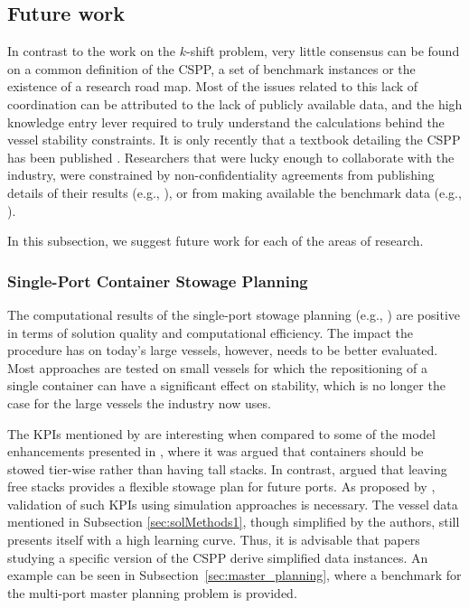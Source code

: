 \documentclass[preprint,12pt,authoryear]{elsarticle}
\begin{document}
\subsection{Future work}
In contrast to the work on the $k$-shift problem, very little consensus can be found on a common definition of the CSPP, a set of benchmark instances or the existence of a research road map. Most of the issues related to this lack of coordination can be attributed to the lack of publicly available data, and the high knowledge entry lever required to truly understand the calculations behind the vessel stability constraints. It is only recently that a textbook detailing the CSPP has been published \citep{Jensen2018ContainerPlanning}. Researchers that were lucky enough to collaborate with the industry, were constrained by non-confidentiality agreements from publishing details of their results (e.g., \cite{Wilson2001ContainerStudy}), or from making available the benchmark data (e.g., \cite{Pacino2011FastVessels}).

In this subsection, we suggest future work for each of the areas of research.

\subsubsection{Single-Port Container Stowage Planning}
The computational results of the single-port stowage planning (e.g., \cite{Cho1981DevelopmentPlanning, Ambrosino2010AnProblem}) are positive in terms of solution quality and computational efficiency. The impact the procedure has on today's large vessels, however, needs to be better evaluated. Most approaches are tested on small vessels for which the repositioning of a single container can have a significant effect on stability, which is no longer the case for the large vessels the industry now uses. 

The KPIs mentioned by \cite{Larsen2021AProblem} are interesting when compared to some of the model enhancements presented in \cite{Zhu2020IntegerProblem}, where it was argued that containers should be stowed tier-wise rather than having tall stacks. In contrast, \cite{Pacino2010ABays, Delgado2012AStowage, Larsen2021AProblem} argued that leaving free stacks provides a flexible stowage plan for future ports. As proposed by \cite{Larsen2021AProblem}, validation of such KPIs using simulation approaches is necessary. The vessel data mentioned in Subsection \ref{sec:solMethods1}, though simplified by the authors, still presents itself with a high learning curve. Thus, it is advisable that papers studying a specific version of the CSPP derive simplified data instances. An example can be seen in Subsection~\ref{sec:master_planning}, where a benchmark for the multi-port master planning problem is provided. 
\end{document}
